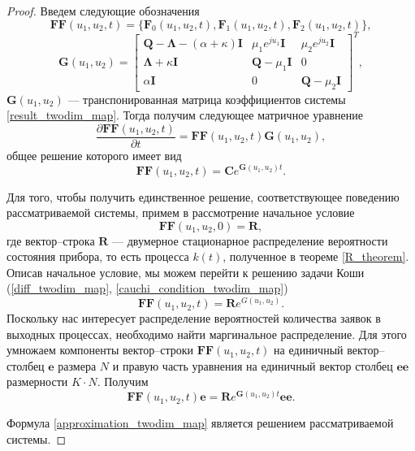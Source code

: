 \begin{proof}
	Введем следующие обозначения
	\begin{equation*}
		\boldsymbol{FF}(u_{1},u_{2},t) = \{\boldsymbol{F}_{0}(u_{1},u_{2},t),\boldsymbol{F}_{1}(u_{1},u_{2},t),\boldsymbol{F}_{2}(u_{1},u_{2},t)\},
	\end{equation*}  
	\begin{equation*}
		\boldsymbol{G}(u_{1},u_{2})=\begin{bmatrix}
			\boldsymbol{Q}-\boldsymbol{\Lambda}-(\alpha + \kappa)\boldsymbol{I} & \mu_{1}e^{ju_{1}}\boldsymbol{I} &  \mu_{2}e^{ju_{2}}\boldsymbol{I}\\
			\boldsymbol{\Lambda}+\kappa\boldsymbol{I} & \boldsymbol{Q}-\mu_{1}\boldsymbol{I} & 0\\
			\alpha\boldsymbol{I} & 	0 &	\boldsymbol{Q}-\mu_{2}\boldsymbol{I}
		\end{bmatrix}^{T},
	\end{equation*}
	$\boldsymbol{G}(u_{1},u_{2})$ --- транспонированная матрица коэффициентов системы \eqref{result_twodim_map}.
	Тогда получим следующее матричное уравнение
	\begin{equation*}
		\frac{{\partial \boldsymbol{FF}(u_{1},u_{2},t)}}{{\partial t}} =\boldsymbol{FF}(u_{1},u_{2},t)\boldsymbol{G}(u_{1},u_{2}),
	\end{equation*}
	общее решение которого имеет вид
	\begin{equation} \label{diff_twodim_map}
		\boldsymbol{FF}(u_{1},u_{2},t)=\boldsymbol{C}e^{\boldsymbol{G}(u_{1},u_{2})t}.
	\end{equation}

	Для того, чтобы получить единственное решение, соответствующее поведению рассматриваемой системы, примем в рассмотрение начальное условие
	\begin{equation} \label{cauchi_condition_twodim_map}
		\boldsymbol{FF}(u_{1},u_{2},0)=\boldsymbol{R},
	\end{equation}
	где вектор--строка $\boldsymbol{R}$ --- двумерное стационарное распределение вероятности состояния прибора, то есть процесса $k(t)$, полученное в теореме \ref{R_theorem}.
	Описав начальное условие, мы можем перейти к решению задачи Коши (\ref{diff_twodim_map}, \ref{cauchi_condition_twodim_map})
	\begin{equation*} 
		\boldsymbol{FF}(u_{1},u_{2},t)=\boldsymbol{R}e^{G(u_{1},u_{2})}.
	\end{equation*}
	Поскольку нас интересует распределение вероятностей количества заявок в выходных процессах, необходимо найти маргинальное распределение. Для этого умножаем компоненты вектор--строки $\boldsymbol{FF}(u_{1},u_{2},t)$ на единичный вектор--столбец $\boldsymbol{e}$ размера $N$ и правую часть уравнения на единичный вектор столбец $\boldsymbol{ee}$ размерности $K \cdot N$. Получим
	\begin{equation}\label{approximation_twodim_map}
		\boldsymbol{FF}(u_{1},u_{2},t)\boldsymbol{e}=\boldsymbol{R}e^{\boldsymbol{G}(u_{1},u_{2})t}\boldsymbol{ee}.
	\end{equation}

	Формула \eqref{approximation_twodim_map} является решением рассматриваемой системы. 
\end{proof}

